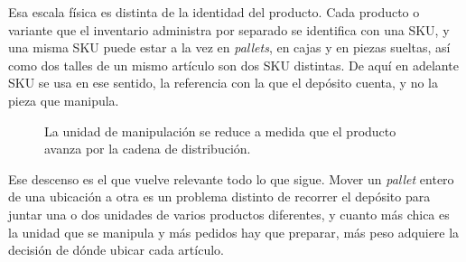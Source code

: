 Esa escala física es distinta de la identidad del producto.
Cada producto o variante que el inventario administra por separado se identifica con una \gls{SKU}, y una misma SKU puede estar a la vez en \emph{pallets}, en cajas y en piezas sueltas, así como dos talles de un mismo artículo son dos SKU distintas.
De aquí en adelante SKU se usa en ese sentido, la referencia con la que el depósito cuenta, y no la pieza que manipula.

\begin{figure}[ht]
    \centering
    \caption{La unidad de manipulación se reduce a medida que el producto avanza por la cadena de distribución.}
    \label{fig:unidades-manipulacion}
\end{figure}


Ese descenso es el que vuelve relevante todo lo que sigue.
Mover un \emph{pallet} entero de una ubicación a otra es un problema distinto de recorrer el depósito para juntar una o dos unidades de varios productos diferentes, y cuanto más chica es la unidad que se manipula y más pedidos hay que preparar, más peso adquiere la decisión de dónde ubicar cada artículo.

